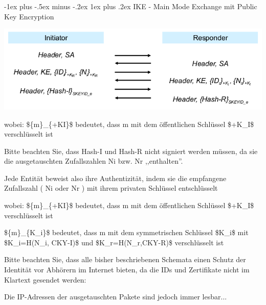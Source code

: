 \documentclass[a4paper]{article}
\makeatletter
\renewcommand{\subsubsection}{\@startsection{subsubsection}{3}{0mm}%
 {-1ex plus -.5ex minus -.2ex}%
 {1ex plus .2ex}%
 {\normalfont\small\bfseries}}
\makeatother
\begin{document}
\begin{multicols}{3}
\begin{itemize*}
            \subsubsection{IKE - Main Mode Exchange mit Public Key
                  Encryption}

            \begin{itemize*}
                  \item \includegraphics[width=\linewidth]{Assets/NetworkSecurity-IKE-exchange-public-key.png}
                  \begin{itemize*}
                        \item wobei: \$\{m\}\_\{+KI\}\$ bedeutet, dass m mit dem öffentlichen Schlüssel \$+K\_I\$ verschlüsselt ist
                        \item Bitte beachten Sie, dass Hash-I und Hash-R nicht signiert werden müssen, da sie die ausgetauschten Zufallszahlen Ni bzw. Nr ,,enthalten''.
                        \begin{itemize*} \item Jede Entität beweist also ihre Authentizität, indem sie die empfangene Zufallszahl ( Ni oder Nr ) mit ihrem privaten Schlüssel entschlüsselt \end{itemize*}
                  \end{itemize*}
                  \begin{itemize*}
                        \item wobei: \$\{m\}\_\{+KI\}\$ bedeutet, dass m mit dem öffentlichen Schlüssel \$+K\_I\$ verschlüsselt ist
                        \item \$\{m\}\_\{K\_i\}\$ bedeutet, dass m mit dem symmetrischen Schlüssel \$K\_i\$ mit \$K\_i=H(N\_i, CKY-I)\$ und \$K\_r=H(N\_r,CKY-R)\$ verschlüsselt ist
                        \item Bitte beachten Sie, dass alle bisher beschriebenen Schemata einen Schutz der Identität vor Abhörern im Internet bieten, da die IDs und Zertifikate nicht im Klartext gesendet werden:
                        \item Die IP-Adressen der ausgetauschten Pakete sind jedoch immer lesbar...
                  \end{itemize*}
            \end{itemize*}



\end{itemize*}
\end{multicols}
\end{document}
